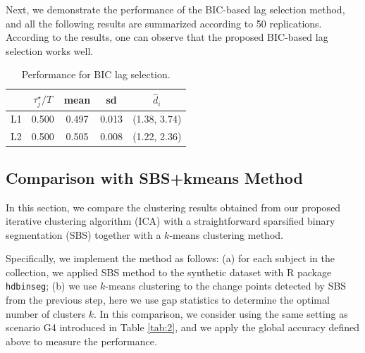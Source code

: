 \documentclass[11pt]{article}
\begin{document}
Next, we demonstrate the performance of the BIC-based lag selection method, and all the following results are summarized according to 50 replications. According to the results, one can observe that the proposed BIC-based lag selection works well. 
\begin{table}[!ht]
    \centering
    \caption{Performance for BIC lag selection.}
    \label{tab:bic}
    \begin{tabular}{c|c|c|c|c}
    \hline\hline
         & $\tau_j^\star/T$ & mean & sd & $\widehat{d}_i$ \\
    \hline
      L1 & 0.500 & 0.497 & 0.013 & (1.38, 3.74) \\
      L2 & 0.500 & 0.505 & 0.008 & (1.22, 2.36) \\
    \hline\hline
    \end{tabular}
\end{table}

\subsection{Comparison with SBS+kmeans Method}
In this section, we compare the clustering results obtained from our proposed iterative clustering algorithm (ICA) with a straightforward sparsified binary segmentation (SBS) together with a $k$-means clustering method. 

Specifically, we implement the method as follows: (a) for each subject in the collection, we applied SBS method to the synthetic dataset with R package \texttt{hdbinseg}; (b) we use $k$-means clustering to the change points detected by SBS from the previous step, here we use gap statistics to determine the optimal number of clusters $k$. In this comparison, we consider using the same setting as scenario G4 introduced in Table \ref{tab:2}, and we apply the global accuracy defined above to measure the performance. 
\begin{table}[!ht]
    \centering
    \caption{Performance compared with SBS+kmeans, BSS+kmeans, and FVARSeg+kmeans methods on scenario G4.}
    \label{tab:sbs_compare}
\end{table}
\end{document}
